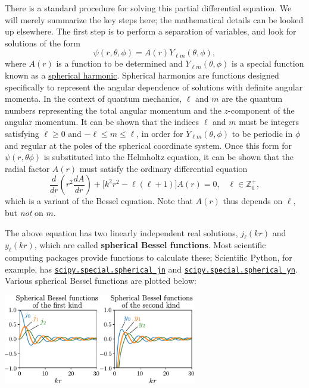 \documentclass[pra,12pt]{revtex4}
\begin{document}
There is a standard procedure for solving this partial differential
equation.  We will merely summarize the key steps here; the
mathematical details can be looked up elsewhere.  The first step is to
perform a separation of variables, and look for solutions of the
form
$$\psi(r,\theta,\phi) = A(r) Y_{\ell m}(\theta,\phi),$$
where $A(r)$ is a function to be determined and $Y_{\ell
  m}(\theta,\phi)$ is a special function known as a
\href{https://en.wikipedia.org/wiki/Spherical_harmonics}{spherical
  harmonic}.  Spherical harmonics are functions designed specifically
to represent the angular dependence of solutions with definite angular
momenta.  In the context of quantum mechanics, $\ell$ and $m$ are the
quantum numbers representing the total angular momentum and the
$z$-component of the angular momentum.  It can be shown that the
indices $\ell$ and $m$ must be integers satisfying $\ell \ge 0$ and
$-\ell\le m \le \ell$, in order for $Y_{\ell m}(\theta,\phi)$ to be
periodic in $\phi$ and regular at the poles of the spherical
coordinate system.  Once this form for $\psi(r,\theta\phi)$ is
substituted into the Helmholtz equation, it can be shown that the
radial factor $A(r)$ must satisfy the ordinary differential equation
$$\frac{d}{dr}\left(r^2\frac{dA}{dr}\right) + \Big[k^2r^2 - \ell(\ell+1)\Big] A(r) = 0, \;\;\;\ell \in \mathbb{Z}_0^+,$$
which is a variant of the Bessel equation.  Note that $A(r)$ thus
depends on $\ell$, but \textit{not} on $m$.

The above equation has two linearly independent real solutions,
$j_\ell(kr)$ and $y_\ell(kr)$, which are called \textbf{spherical
  Bessel functions}.  Most scientific computing packages provide
functions to calculate these; Scientific Python, for example, has
\href{https://docs.scipy.org/doc/scipy/reference/generated/scipy.special.spherical_jn.html}{\texttt{scipy.special.spherical\_jn}}
and
\href{https://docs.scipy.org/doc/scipy/reference/generated/scipy.special.spherical_yn.html}{\texttt{scipy.special.spherical\_yn}}.
Various spherical Bessel functions are plotted below:

\vskip 0.5cm
\begin{center}
  \includegraphics[width=0.63\textwidth]{spherical_bessel}
\end{center}
\end{document}
